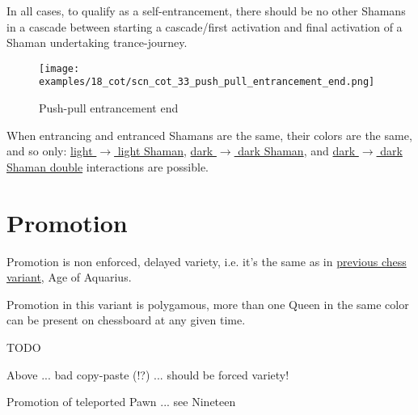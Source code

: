 In all cases, to qualify as a self-entrancement, there should be no other Shamans in a cascade
between starting a cascade/first activation and final activation of a Shaman undertaking
trance-journey.

\clearpage %

\noindent
\begin{figure}[!h]
\texttt{[image: examples/18\_cot/scn\_cot\_33\_push\_pull\_entrancement\_end.png]}
\caption{Push-pull entrancement end}
\label{fig:scn_cot_33_push_pull_entrancement_end}
\end{figure}

When entrancing and entranced Shamans are the same, their colors are the same, and so only: \newline
\hyperref[fig:scn_cot_16_light_light_shaman_interaction_start]{light $\rightarrow$ light Shaman}, \newline
\hyperref[fig:scn_cot_20_dark_dark_shaman_interaction_start]{dark $\rightarrow$ dark Shaman}, and \newline
\hyperref[fig:scn_cot_22_dark_dark_shaman_double_interaction_start]{dark $\rightarrow$ dark Shaman double}
interactions are possible.

\clearpage %

\section*{Promotion}

Promotion is non enforced, delayed variety, i.e. it's the same as in
\hyperref[sec:Age of Aquarius/Promotion]{previous chess variant}, Age of Aquarius.

Promotion in this variant is polygamous, more than one Queen in the same color
can be present on chessboard at any given time.

\huge{TODO}
\normalsize{}

Above ... bad copy-paste (!?) ... should be forced variety!

Promotion of teleported Pawn ... see Nineteen


